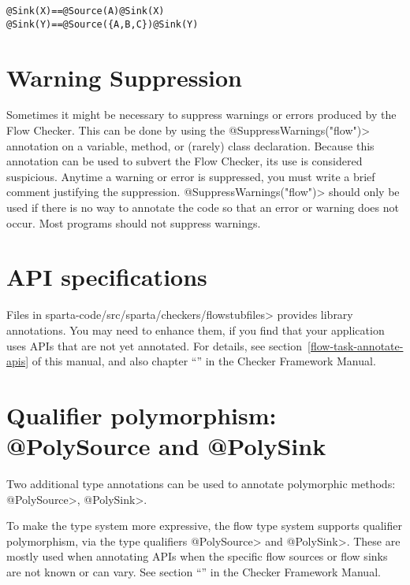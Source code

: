 \begin{alltt}
  @Sink(X)                   ==   @Source(A) @Sink(X)
  @Sink(Y)                   ==   @Source(\{A,B,C\}) @Sink(Y)
\end{alltt}


\section{Warning Suppression\label{sec:waringsuppression}}
 
Sometimes it might be necessary to suppress warnings or errors produced by
the Flow Checker.  This can be done by using the
\<@SuppressWarnings("flow")> annotation on a variable, method, or (rarely)
class declaration.  Because this annotation can be used to subvert the Flow
Checker, its use is considered suspicious.  Anytime a warning or error is
suppressed, you must write a brief comment justifying the suppression.
\<@SuppressWarnings("flow")> should only be used if there is no way to
annotate the code so that an error or warning does not occur.  Most
programs should not suppress warnings.


\section{API specifications\label{sec:apispecs}}

Files in  \<sparta-code/src/sparta/checkers/flowstubfiles> provides library
annotations.  You may need to enhance them, if you find that your application
uses APIs that are not yet annotated.  For details, see
section~\ref{flow-task-annotate-apis} of this manual, and also 
chapter
``'' in the Checker Framework Manual.


\section{Qualifier polymorphism: @PolySource  and @PolySink \label{sec:polyflowsources}}

Two additional type annotations can be used to annotate polymorphic
methods: \<@PolySource>, \<@PolySink>.

To make the type system more expressive, the flow type system supports
qualifier polymorphism, via the type qualifiers \<@PolySource> and
\<@PolySink>.  These are mostly used when annotating APIs when the
specific flow sources or flow sinks are not known or can vary. 
See section ``'' in the Checker Framework Manual.  

